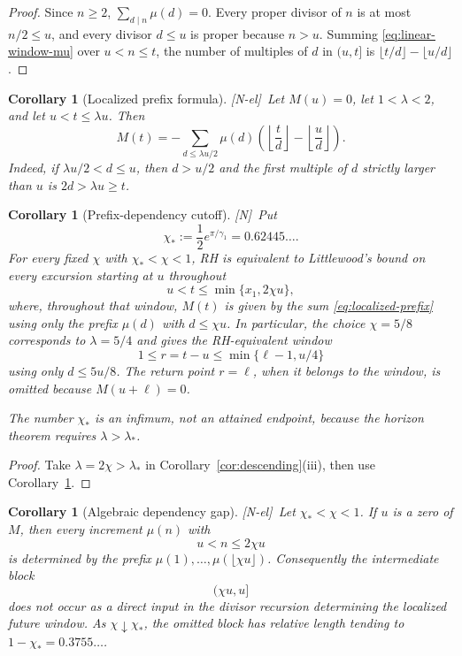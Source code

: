 \documentclass[11pt]{amsart}
\numberwithin{equation}{section}
\theoremstyle{plain}
\newtheorem{corollary}[theorem]{Corollary}
\theoremstyle{definition}
\theoremstyle{remark}
\newcommand{\tagN}{\textup{[N]}}
\newcommand{\tagNE}{\textup{[N-el]}}
\begin{document}
\begin{proof}
Since $n\ge2$, $\sum_{d\mid n}\mu(d)=0$. Every proper divisor of $n$ is at
most $n/2\le u$, and every divisor $d\le u$ is proper because $n>u$. Summing
\eqref{eq:linear-window-mu} over $u<n\le t$, the number of multiples of $d$
in $(u,t]$ is $\lfloor t/d\rfloor-\lfloor u/d\rfloor$.
\end{proof}

\begin{corollary}[Localized prefix formula]
\label{cor:localized-prefix}
\tagNE\ Let $M(u)=0$, let $1<\lambda<2$, and let $u<t\le\lambda u$.  Then
\begin{equation}
\label{eq:localized-prefix}
M(t)=-\sum_{d\le\lambda u/2}\mu(d)
\left(\left\lfloor\frac td\right\rfloor-
\left\lfloor\frac ud\right\rfloor\right).
\end{equation}
Indeed, if $\lambda u/2<d\le u$, then $d>u/2$ and the first multiple of
$d$ strictly larger than $u$ is $2d>\lambda u\ge t$.
\end{corollary}

\begin{corollary}[Prefix-dependency cutoff]
\label{cor:prefix-cutoff}
\tagN\ Put
\[
\chi_*:=\frac12e^{\pi/\gamma_1}=0.62445\ldots .
\]
For every fixed $\chi$ with $\chi_*<\chi<1$, RH is equivalent to
Littlewood's bound on every excursion starting at $u$ throughout
\[
u<t\le\min\{x_1,2\chi u\},
\]
where, throughout that window, $M(t)$ is given by the sum
\eqref{eq:localized-prefix} using only the prefix
$\mu(d)$ with $d\le\chi u$.  In particular, the choice
$\chi=5/8$ corresponds to $\lambda=5/4$ and gives the RH-equivalent
window
\[
1\le r=t-u\le\min\{\ell-1,u/4\}
\]
using only $d\le5u/8$. The return point $r=\ell$, when it belongs to the
window, is omitted because $M(u+\ell)=0$.

The number $\chi_*$ is an infimum, not an attained endpoint, because the
horizon theorem requires $\lambda>\lambda_*$.
\end{corollary}

\begin{proof}
Take $\lambda=2\chi>\lambda_*$ in
Corollary~\ref{cor:descending}(iii), then use
Corollary~\ref{cor:localized-prefix}.
\end{proof}


\begin{corollary}[Algebraic dependency gap]
\label{cor:dependency-gap}
\tagNE\ Let $\chi_*<\chi<1$.  If $u$ is a zero of $M$, then every increment
$\mu(n)$ with
\[
u<n\le2\chi u
\]
is determined by the prefix
$\mu(1),\ldots,\mu(\lfloor\chi u\rfloor)$.  Consequently the intermediate
block
\[
(\chi u,u]
\]
does not occur as a direct input in the divisor recursion determining the
localized future window.  As $\chi\downarrow\chi_*$, the omitted block
has relative length tending to
$1-\chi_*=0.3755\ldots$.
\end{corollary}
\end{document}
